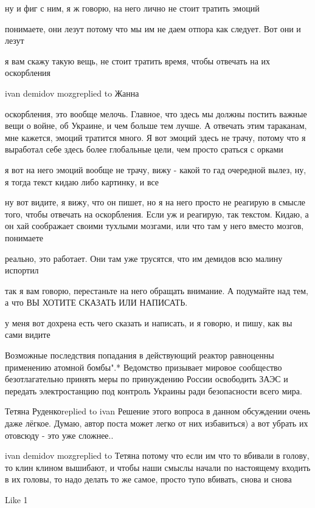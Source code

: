ну и фиг с ним, я ж говорю, на него лично не стоит тратить эмоций

понимаете, они лезут потому что мы им не даем отпора как следует. Вот они и
лезут

я вам скажу такую вещь, не стоит тратить время, чтобы отвечать на их
оскорбления


ivan demidov mozgreplied to Жанна

оскорбления, это вообще мелочь. Главное, что здесь мы должны постить важные
вещи о войне, об Украине, и чем больше тем лучше. А отвечать этим тараканам,
мне кажется, эмоций тратится много. Я вот эмоций здесь не трачу, потому что я
выработал себе здесь более глобальные цели, чем просто сраться с орками

я вот на него эмоций вообще не трачу, вижу - какой то гад очередной вылез, ну,
я тогда текст кидаю либо картинку, и все

ну вот видите, я вижу, что он пишет, но я на него просто не реагирую в смысле
того, чтобы отвечать на оскорбления. Если уж и реагирую, так текстом. Кидаю, а
он хай соображает своими тухлыми мозгами, или что там у него вместо мозгов,
понимаете

реально, это работает. Они там уже трусятся, что им демидов всю малину испортил

так я вам говорю, перестаньте на него обращать внимание. А подумайте над тем, а
что ВЫ ХОТИТЕ СКАЗАТЬ ИЛИ НАПИСАТЬ.

у меня вот дохрена есть чего сказать и написать, и я говорю, и пишу, как вы
сами видите


Возможные последствия попадания в действующий реактор равноценны применению атомной бомбы".*
Ведомство призывает мировое сообщество безотлагательно принять меры по принуждению России освободить ЗАЭС и передать электростанцию под контроль Украины ради безопасности всего мира.

Тетяна Руденкоreplied to ivan
Решение этого вопроса в данном обсуждении очень даже лёгкое. Думаю, автор поста может легко от них избавиться) а вот убрать их отовсюду - это уже сложнее..

ivan demidov mozgreplied to Тетяна
потому что если им что то вбивали в голову, то клин клином вышибают, и чтобы наши смыслы начали по настоящему входить в их головы, то надо делать то же самое, просто тупо вбивать, снова и снова

    Like 1

